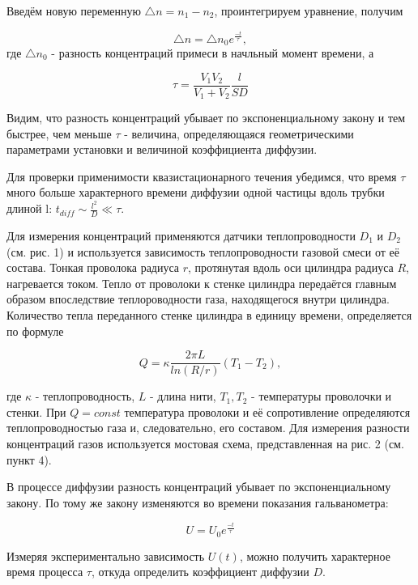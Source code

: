 \documentclass[a4paper, 12pt]{article} %
\begin{document}
Введём новую переменную $\triangle n = n_1-n_2$, проинтегрируем уравнение, получим

\begin{equation}
	\triangle n = \triangle n_0 e^{\frac{-t}{\tau}},
\end{equation}
где $\triangle n_0$ - разность концентраций примеси в начльный момент времени, а

\begin{equation}
	\tau = \frac{V_1 V_2}{V_1 + V_2} \frac {l}{SD}
\end{equation}

Видим, что разность концентраций убывает по экспоненциальному закону и тем быстрее, чем меньше $\tau$ - величина, определяющаяся геометрическими параметрами установки и величиной коэффициента диффузии.

Для проверки применимости квазистационарного течения убедимся, что время $\tau$ много больше характерного времени диффузии одной частицы вдоль трубки длиной l: $t_{diff} \sim \frac{l^2}{D} \ll \tau$.

Для измерения концентраций применяются датчики теплопроводности $D_1$ и $D_2$ (см. рис. 1) и используется зависимость теплопроводности газовой смеси от её состава. Тонкая проволока радиуса $r$, протянутая вдоль оси цилиндра радиуса $R$, нагревается током. Тепло от проволоки к стенке цилиндра передаётся главным образом впоследствие теплороводности газа, находящегося внутри цилиндра. Количество тепла переданного стенке цилиндра в единицу времени, определяется по формуле

\begin{equation}
	Q = \kappa \frac{2\pi L}{ln (R/r)}(T_1-T_2),
\end{equation}

где $\kappa$ - теплопроводность, $L$ - длина нити, $T_1, T_2$ - температуры проволочки и стенки. При $Q = const$ температура проволоки и её сопротивление определяются теплопроводностью газа и, следовательно, его составом. Для измерения разности концентраций газов используется  
мостовая схема, представленная на рис. 2 (см. пункт 4).

В процессе диффузии разность концентраций убывает по экспоненциальному закону. По тому же закону изменяются во времени показания гальванометра:

\begin{equation}
	U = U_0 e^{\frac{-t}{\tau}}
\end{equation}

Измеряя экспериментально зависимость $U(t)$, можно получить характерное время процесса $\tau$, откуда определить коэффициент диффузии $D$.
\end{document}
